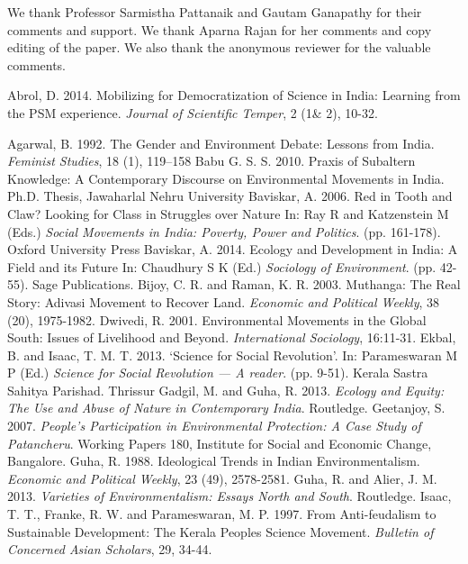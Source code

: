 \documentclass[twoside, 13pt]{article}
\begin{document}
{{{{{\fontsize{12}{14}\selectfont We thank Professor Sarmistha Pattanaik and Gautam Ganapathy for their comments and support. We thank Aparna Rajan for her comments and copy editing of the paper. We also thank the anonymous reviewer for the valuable comments.}


\vspace{-.5cm}
{\fontsize{12}{14}\selectfont
\begin{thebibliography}{99}

\bibitem{} Abrol, D. 2014. Mobilizing for Democratization of Science in India: Learning from the PSM experience. \textit{Journal of Scientific Temper}, 2 (1\& 2), 10-32.

\bibitem{} Agarwal, B. 1992. The Gender and Environment Debate: Lessons from India. \textit{Feminist Studies}, 18 (1), 119–158
\bibitem{} Babu G. S. S. 2010. Praxis of Subaltern Knowledge: A Contemporary Discourse on Environmental Movements in India. Ph.D. Thesis, Jawaharlal Nehru University
\bibitem{} Baviskar, A. 2006. Red in Tooth and Claw? Looking for Class in Struggles over Nature In: Ray R and Katzenstein M (Eds.) \textit{Social Movements in India: Poverty, Power and Politics}. (pp. 161-178). Oxford University Press
\bibitem{} Baviskar, A. 2014. Ecology and Development in India: A Field and its Future In: Chaudhury S K (Ed.) \textit{Sociology of Environment}. (pp. 42-55). Sage Publications. 
\bibitem{} Bijoy, C. R. and Raman, K. R. 2003. Muthanga: The Real Story: Adivasi Movement to Recover Land. \textit{Economic and Political Weekly}, 38 (20), 1975-1982.
\bibitem{} Dwivedi, R. 2001. Environmental Movements in the Global South: Issues of Livelihood and Beyond. \textit{International Sociology}, 16:11-31.
\bibitem{} Ekbal, B. and Isaac, T. M. T. 2013. ‘Science for Social Revolution’. In: Parameswaran M P (Ed.) \textit{Science for Social Revolution — A reader}. (pp. 9-51). Kerala Sastra Sahitya Parishad. Thrissur
\bibitem{} Gadgil, M. and Guha, R. 2013. \textit{Ecology and Equity: The Use and Abuse of Nature in Contemporary India}. Routledge.
\bibitem{} Geetanjoy, S. 2007. \textit{People’s Participation in Environmental Protection: A Case Study of Patancheru}. Working Papers 180, Institute for Social and Economic Change, Bangalore.
\bibitem{} Guha, R. 1988. Ideological Trends in Indian Environmentalism. \textit{Economic and Political Weekly}, 23 (49), 2578-2581.
\bibitem{} Guha, R. and Alier, J. M. 2013. \textit{Varieties of Environmentalism: Essays North and South}. Routledge.
\bibitem{} Isaac, T. T., Franke, R. W. and Parameswaran, M. P. 1997. From Anti-feudalism to Sustainable Development: The Kerala Peoples Science Movement. \textit{Bulletin of Concerned Asian Scholars}, 29, 34-44.

\end{thebibliography}}}}}}
\end{document}
